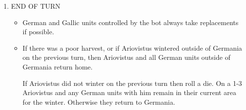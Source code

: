 \begin{enumerate}
  \item END OF TURN
  \begin{itemize}
    \item German and Gallic units controlled by the bot always take replacements if possible.
    \item If there was a poor harvest, or if Ariovistus wintered outside of Germania on the previous turn, then Ariovistus and all German units outside of Germania return home.
    
    If Ariovistus did not winter on the previous turn then roll a die. On a 1-3 Ariovistus and any German units with him remain in their current area for the winter. Otherwise they return to Germania.
  \end{itemize}
\end{enumerate}

